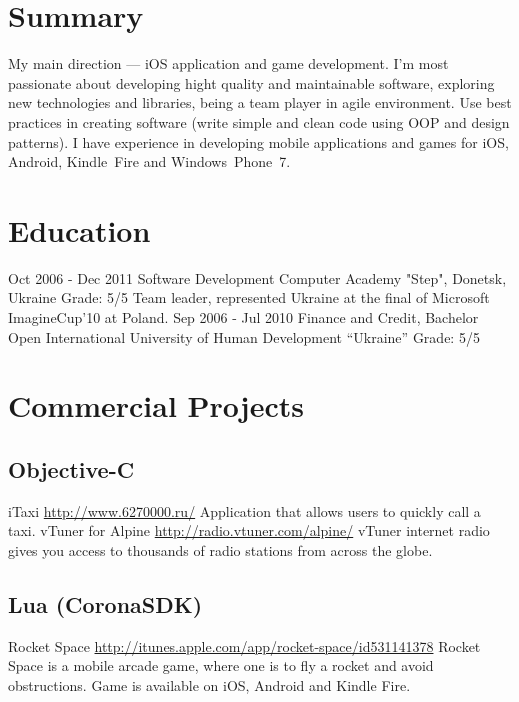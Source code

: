 \documentclass[11pt,a4paper]{moderncv}
\begin{document}
\maketitle

\section{Summary}
\cvline
  {}
  {My main direction --- iOS application and game development.\newline{}
  I'm most passionate about developing hight quality and maintainable software, exploring new technologies and libraries, being a team player in agile environment. Use best practices in creating software (write simple and clean code using OOP and design patterns). I have experience in developing mobile applications and games for iOS, Android, Kindle~Fire and Windows~Phone~7.{}}

\section{Education}
  \cventry
    {Oct 2006 - Dec 2011}
    {Software Development}
    {Computer Academy "Step", Donetsk, Ukraine}
    {Grade: 5/5}{}
    {Team leader, represented Ukraine at the final of Microsoft ImagineCup'10 at Poland.}
  \cventry
    {Sep 2006 - Jul 2010}
    {Finance and Credit, Bachelor}
    {\newline Open International University of Human Development “Ukraine”}
    {Grade: 5/5}{}{}
    
\section{Commercial Projects}
  \subsection{Objective-C}
  \cvline
    {iTaxi}
    {\url{http://www.6270000.ru/}\newline{}
    Application that allows users to quickly call a taxi.}
  \cvline
    {vTuner for Alpine}
    {\url{http://radio.vtuner.com/alpine/}\newline{}
    vTuner internet radio gives you access to thousands of radio stations from across the globe.}
    
  \subsection{Lua (CoronaSDK)}
  \cvline
    {Rocket Space}
    {\url{http://itunes.apple.com/app/rocket-space/id531141378}\newline{}
    Rocket Space is a mobile arcade game, where one is to fly a rocket and avoid obstructions.\newline
    Game is available on iOS, Android and Kindle Fire.}
    
\end{document}
